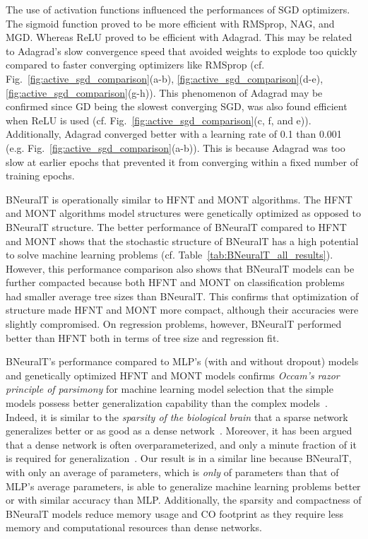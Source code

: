 \documentclass[11pt,a4paper]{article}
\begin{document}
    The use of activation functions influenced the performances of SGD optimizers. The sigmoid function proved to be more efficient with RMSprop, NAG, and MGD.  Whereas ReLU proved to be efficient with Adagrad. This  may be related to Adagrad's slow convergence speed that avoided weights to explode too quickly compared to faster converging optimizers like RMSprop (cf. Fig.~\ref{fig:active_sgd_comparison}(a-b), \ref{fig:active_sgd_comparison}(d-e), \ref{fig:active_sgd_comparison}(g-h)). This phenomenon of Adagrad may be confirmed since GD being the slowest converging SGD, was also found efficient when ReLU is used (cf. Fig.~\ref{fig:active_sgd_comparison}(c, f, and e)).
    Additionally, Adagrad converged better with a learning rate of 0.1 than 0.001 (e.g.  Fig.~\ref{fig:active_sgd_comparison}(a-b)). This is because Adagrad was too slow at earlier epochs that prevented it from converging within a fixed number of training epochs. 
    
    BNeuralT is operationally similar to HFNT and MONT algorithms. The HFNT and MONT algorithms model structures were genetically optimized  as opposed to BNeuralT structure. The better performance of BNeuralT compared to HFNT and MONT shows that the stochastic structure of BNeuralT has a high potential to solve machine learning problems (cf. Table~\ref{tab:BNeuralT_all_results}). However, this performance comparison also shows that BNeuralT models can be further compacted because both HFNT and MONT on classification problems had smaller average tree sizes than BNeuralT. This confirms that optimization of structure made HFNT and MONT more compact, although their accuracies were slightly compromised. On regression problems, however, BNeuralT performed better than HFNT both in terms of tree size and regression fit.  
    
    BNeuralT's performance compared to MLP's (with and without dropout) models and genetically optimized HFNT and MONT models confirms \textit{Occam's razor principle of parsimony} for machine learning model selection that the simple models possess better generalization capability than the complex models~\citep{blumer1987occam}. Indeed, it is similar to the \textit{sparsity of the biological brain} that a sparse network generalizes better or as good as a dense network~\citep{friston2008hierarchical,herculano2010connectivity,hoefler2021sparsity}. Moreover, it has been argued that a dense network is often overparameterized, and only a minute fraction of it is required for generalization~\citep{denil2013predicting}. Our result is in a similar line because BNeuralT, with only an average of  parameters, which is \textit{only}  of parameters than that of MLP's average  parameters, is able to generalize machine learning problems better or with similar accuracy than MLP. Additionally, the sparsity and compactness of BNeuralT models reduce memory usage and CO footprint as they require less memory and computational resources than dense networks.
    
\end{document}
